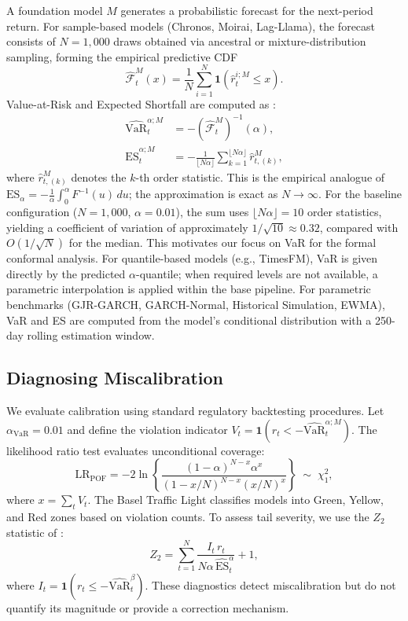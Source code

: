 \documentclass[preprint,11pt,authoryear]{elsarticle}
\newcommand{\VaR}{\mathrm{VaR}}
\newcommand{\ES}{\mathrm{ES}}
\newcommand{\1}{\boldsymbol{1}}
\newcommand{\Fhat}{\hat{\mathcal{F}}}
\begin{document}
	A foundation model $M$ generates a probabilistic forecast for
	the next-period return. For sample-based models (Chronos,
	Moirai, Lag-Llama), the forecast consists of $N=1{,}000$ draws
	obtained via ancestral or mixture-distribution sampling,
	forming the empirical predictive CDF
	\[
	\Fhat_t^M(x) = \frac{1}{N}\sum_{i=1}^{N}
	\1(\hat{r}_t^{i;M}\leq x).
	\]
	Value-at-Risk and Expected Shortfall are computed as
	\citep{pele2025llmvar}:
	\begin{align}
		\widehat{\VaR}_t^{\alpha;M}
		&= -(\Fhat_t^M)^{-1}(\alpha), \\
		\widehat{\ES}_t^{\alpha;M}
		&= -\frac{1}{\lfloor N\alpha\rfloor}
		\sum_{k=1}^{\lfloor N\alpha\rfloor}\hat{r}_{t,(k)}^M,
	\end{align}
	where $\hat{r}_{t,(k)}^M$ denotes the $k$-th order statistic.
	This is the empirical analogue of
	$\ES_\alpha = -\frac{1}{\alpha}\int_0^\alpha F^{-1}(u)\,du$;
	the approximation is exact as $N \to \infty$.
	For the baseline configuration ($N = 1{,}000$,
	$\alpha = 0.01$), the sum uses $\lfloor N\alpha \rfloor = 10$
	order statistics, yielding a coefficient of variation of
	approximately $1/\sqrt{10} \approx 0.32$, compared with
	$O(1/\sqrt{N})$ for the median. This motivates our focus on
	VaR for the formal conformal analysis.
	For quantile-based models (e.g., TimesFM), VaR is given
	directly by the predicted $\alpha$-quantile; when required
	levels are not available, a parametric interpolation is applied
	within the base pipeline. For parametric benchmarks
	(GJR-GARCH, GARCH-Normal, Historical Simulation, EWMA), VaR
	and ES are computed from the model's conditional distribution
	with a 250-day rolling estimation window.
	
	\subsection{Diagnosing Miscalibration}
	\label{sec:diag}
	
	We evaluate calibration using standard regulatory backtesting
	procedures. Let $\alpha_{\mathrm{VaR}} = 0.01$ and define the
	violation indicator
	$V_t = \1(r_t < -\widehat{\VaR}_t^{\alpha;M})$. The
	\citet{kupiec1995} likelihood ratio test evaluates
	unconditional coverage:
	\begin{equation}
		\label{eq:kupiec}
		\mathrm{LR}_{\mathrm{POF}} = -2\ln\!\left\{
		\frac{(1-\alpha)^{N-x}\alpha^x}
		{(1-x/N)^{N-x}(x/N)^x}\right\}
		\;\sim\; \chi^2_1,
	\end{equation}
	where $x = \sum_t V_t$. The Basel Traffic Light
	\citep{basel1996} classifies models into Green, Yellow, and
	Red zones based on violation counts. To assess tail severity,
	we use the $Z_2$ statistic of \citet{acerbi2014back}:
	\begin{equation}
		\label{eq:Z2}
		Z_2 = \sum_{t=1}^N
		\frac{I_t\, r_t}{N\alpha\,\widehat{\ES}_t^\alpha} + 1,
	\end{equation}
	where $I_t = \1(r_t \leq -\widehat{\VaR}_t^\beta)$. These
	diagnostics detect miscalibration but do not quantify its
	magnitude or provide a correction mechanism.
	
\end{document}
